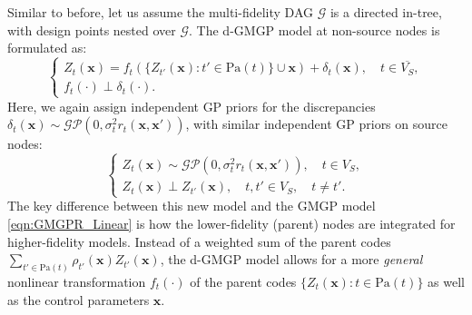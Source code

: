 \documentclass[12pt]{article}
\newcommand{\bs}[1]{\boldsymbol{#1}}
\newcommand{\cmtI}[1]{{\color{magenta} (Irene: #1)}}
\newcommand{\cmtS}[1]{{\color{blue} (Simon: #1)}}
\begin{document}

Similar to before, let us assume the multi-fidelity DAG $\mathcal{G}$ is a directed in-tree, with design points nested over $\mathcal{G}$. The d-GMGP model at non-source nodes is formulated as:%
\begin{equation}\label{eqn:GMGPR_nonlinear}
    \begin{cases}
      Z_t(\bs{x}) = f_t(\{Z_{t'}(\bs{x}):t'\in \text{Pa}(t)\} \cup \bs{x})+\delta_t(\bs{x}), \quad t \in \overline{{V}_{S}},\\
      f_t(\cdot) \perp \delta_t(\cdot).
    \end{cases}
\end{equation}
Here, we again assign independent GP priors for the discrepancies $\delta_t(\bs{x})\sim \mathcal{GP}(0,\sigma_t^2r_t(\bs{x},\bs{x}'))$, with similar independent GP priors on source nodes:
\begin{equation}
    \begin{cases}
        Z_t(\bs{x})\sim \mathcal{GP}(0,\sigma_t^2r_t(\bs{x},\bs{x'})),\quad t\in {V}_S,\\
        Z_t(\bs{x}) \perp Z_{t'}(\bs{x}),\quad t,t'\in {V}_S, \quad t \neq t'.
    \end{cases}
\end{equation}
\noindent The key difference between this new model and the GMGP model \eqref{eqn:GMGPR_Linear} is how the lower-fidelity (parent) nodes are integrated for higher-fidelity models. Instead of a weighted sum of the parent codes $\sum_{t' \in \text{Pa}(t)}\rho_{t'}(\bs{x}) Z_{t'}(\bs{x})$, the d-GMGP model allows for a more \textit{general} nonlinear transformation $f_t(\cdot)$ of the parent codes $\{Z_{t}(\bs{x}):t\in \text{Pa}(t)\}$ as well as the control parameters $\bs{x}$.
\end{document}
